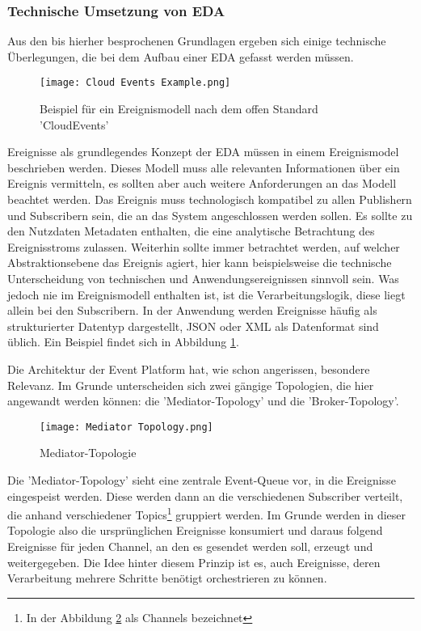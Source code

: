 \subsubsection*{Technische Umsetzung von \ac{EDA}}
\label{teda}
Aus den bis hierher besprochenen Grundlagen ergeben sich einige technische Überlegungen, die bei dem Aufbau einer \ac{EDA} gefasst werden müssen.

\begin{figure}[H]
  \centering
  \texttt{[image: Cloud Events Example.png]}
  \caption[Beispiel für ein Ereignismodell]{Beispiel für ein Ereignismodell nach dem offen Standard 'CloudEvents' \footnotemark}
  \label{cloudeventslabel}
\end{figure}
Ereignisse als grundlegendes Konzept der \ac{EDA} müssen in einem Ereignismodel beschrieben werden. Dieses Modell muss alle relevanten Informationen über ein Ereignis vermitteln, es sollten aber auch weitere Anforderungen an das Modell beachtet werden. Das Ereignis muss technologisch kompatibel zu allen Publishern und Subscribern sein, die an das System angeschlossen werden sollen. Es sollte zu den Nutzdaten Metadaten enthalten, die eine analytische Betrachtung des Ereignisstroms zulassen. Weiterhin sollte immer betrachtet werden, auf welcher Abstraktionsebene das Ereignis agiert, hier kann beispielsweise die technische Unterscheidung von technischen und Anwendungsereignissen sinnvoll sein. Was jedoch nie im Ereignismodell enthalten ist, ist die Verarbeitungslogik, diese liegt allein bei den Subscribern. \cite[Vgl. ][S. 95]{EDA2010} In der Anwendung werden Ereignisse häufig als strukturierter Datentyp dargestellt, JSON oder XML als Datenformat sind üblich. Ein Beispiel findet sich in Abbildung \ref{cloudeventslabel}.

Die Architektur der Event Platform hat, wie schon angerissen, besondere Relevanz. Im Grunde unterscheiden sich zwei gängige Topologien, die hier angewandt werden können: die 'Mediator-Topology' und die 'Broker-Topology'. 
\begin{figure}[H]
  \centering
  \texttt{[image: Mediator Topology.png]}
  \caption[Mediator-Topologie]{Mediator-Topologie \footnotemark}
  \label{mediatortop}
\end{figure}
Die 'Mediator-Topology' sieht eine zentrale Event-Queue vor, in die Ereignisse eingespeist werden. Diese werden dann an die verschiedenen Subscriber verteilt, die anhand verschiedener Topics\footnote{In der Abbildung \ref{mediatortop} als Channels bezeichnet} gruppiert werden. Im Grunde werden in dieser Topologie also die ursprünglichen Ereignisse konsumiert und daraus folgend Ereignisse für jeden Channel, an den es gesendet werden soll, erzeugt und weitergegeben. Die Idee hinter diesem Prinzip ist es, auch Ereignisse, deren Verarbeitung mehrere Schritte benötigt orchestrieren zu können. \cite[Vgl. ][]{wickramarachchi_2017_event} \\

